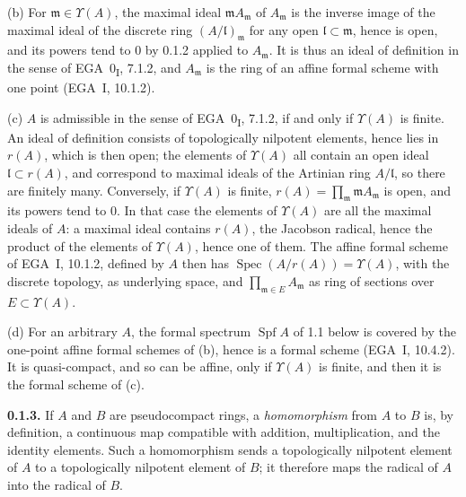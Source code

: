(b) For \(\mathfrak m\in\Upsilon(A)\), the maximal ideal \(\mathfrak mA_{\mathfrak m}\) of
\(A_{\mathfrak m}\) is the inverse image of the maximal ideal of the discrete ring
\((A/\mathfrak l)_{\mathfrak m}\) for any open \(\mathfrak l\subset\mathfrak m\), hence is open, and its
powers tend to \(0\) by 0.1.2 applied to \(A_{\mathfrak m}\). It is thus an ideal of definition in the
sense of EGA~0\textsubscript{I}, 7.1.2, and \(A_{\mathfrak m}\) is the ring of an affine formal scheme
with one point (EGA~I, 10.1.2).

(c) \(A\) is admissible in the sense of EGA~0\textsubscript{I}, 7.1.2, if and only if \(\Upsilon(A)\) is
finite. An ideal of definition consists of topologically nilpotent elements, hence lies in \(r(A)\), which
is then open; the elements of \(\Upsilon(A)\) all contain an open ideal \(\mathfrak l\subset r(A)\), and
correspond to maximal ideals of the Artinian ring \(A/\mathfrak l\), so there are finitely many.
Conversely, if \(\Upsilon(A)\) is finite, \(r(A)=\prod_{\mathfrak m}\mathfrak mA_{\mathfrak m}\) is open,
and its powers tend to \(0\). In that case the elements of \(\Upsilon(A)\) are all the maximal ideals of
\(A\): a maximal ideal contains \(r(A)\), the Jacobson radical, hence the product of the elements of
\(\Upsilon(A)\), hence one of them. The affine formal scheme of EGA~I, 10.1.2, defined by \(A\) then has
\(\operatorname{Spec}(A/r(A))=\Upsilon(A)\), with the discrete topology, as underlying space, and
\(\prod_{\mathfrak m\in E}A_{\mathfrak m}\) as ring of sections over \(E\subset\Upsilon(A)\).

(d) For an arbitrary \(A\), the formal spectrum \(\operatorname{Spf}A\) of 1.1 below is covered by the
one-point affine formal schemes of (b), hence is a formal scheme (EGA~I, 10.4.2). It is quasi-compact,
and so can be affine, only if \(\Upsilon(A)\) is finite, and then it is the formal scheme of (c).

\medskip
\noindent\textbf{0.1.3.}
\label{sga3:VIIB:0.1.3}
If \(A\) and \(B\) are pseudocompact rings, a \emph{homomorphism} from
\(A\) to \(B\) is, by definition, a continuous map compatible with
addition, multiplication, and the identity elements. Such a
homomorphism sends a topologically nilpotent element of \(A\) to a
topologically nilpotent element of \(B\); it therefore maps the radical
of \(A\) into the radical of \(B\).

